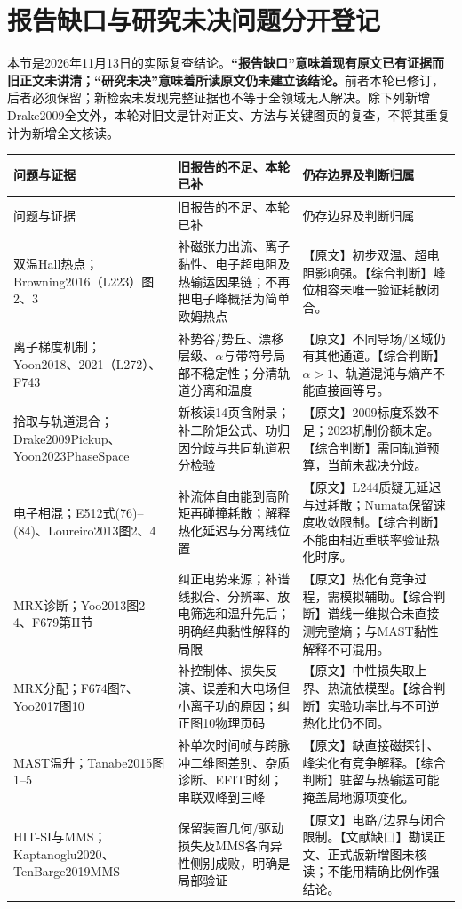 \section{报告缺口与研究未决问题分开登记}
\label{sec:gap_map}
本节是2026年11月13日的实际复查结论。\textbf{“报告缺口”意味着现有原文已有证据而旧正文未讲清；“研究未决”意味着所读原文仍未建立该结论。}前者本轮已修订，后者必须保留；新检索未发现完整证据也不等于全领域无人解决。除下列新增Drake2009全文外，本轮对旧文是针对正文、方法与关键图页的复查，不将其重复计为新增全文核读。
\begingroup\small
\begin{longtable}{P{30mm}P{59mm}P{59mm}}
\toprule 问题与证据 & 旧报告的不足、本轮已补 & 仍存边界及判断归属\\\midrule\endfirsthead
\toprule 问题与证据 & 旧报告的不足、本轮已补 & 仍存边界及判断归属\\\midrule\endhead
双温Hall热点；Browning2016（L223）图2、3 & 补磁张力出流、离子黏性、电子超电阻及热输运因果链；不再把电子峰概括为简单欧姆热点 & 【原文】初步双温、超电阻影响强。【综合判断】峰位相容未唯一验证耗散闭合。\\
离子梯度机制；Yoon2018、2021（L272）、F743 & 补势谷/势丘、漂移层级、$\alpha$与带符号局部不稳定性；分清轨道分离和温度 & 【原文】不同导场/区域仍有其他通道。【综合判断】$\alpha>1$、轨道混沌与熵产不能直接画等号。\\
拾取与轨道混合；Drake2009Pickup、Yoon2023\allowbreak PhaseSpace & 新核读14页含附录；补二阶矩公式、功归因分歧与共同轨道积分检验 & 【原文】2009标度系数不足；2023机制份额未定。【综合判断】需同轨道预算，当前未裁决分歧。\\
电子相混；E512式(76)--(84)、Loureiro2013图2、4 & 补流体自由能到高阶矩再碰撞耗散；解释热化延迟与分离线位置 & 【原文】L244质疑无延迟与过耗散；Numata保留速度收敛限制。【综合判断】不能由相近重联率验证热化时序。\\
MRX诊断；Yoo2013图2--4、F679第II节 & 纠正电势来源；补谱线拟合、分辨率、放电筛选和温升先后；明确经典黏性解释的局限 & 【原文】热化有竞争过程，需模拟辅助。【综合判断】谱线一维拟合未直接测完整熵；与MAST黏性解释不可混用。\\
MRX分配；F674图7、Yoo2017图10 & 补控制体、损失反演、误差和大电场但小离子功的原因；纠正图10物理页码 & 【原文】中性损失取上界、热流依模型。【综合判断】实验功率比与不可逆热化比仍不同。\\
MAST温升；Tanabe2015图1--5 & 补单次时间帧与跨脉冲二维图差别、杂质诊断、EFIT时刻；串联双峰到三峰 & 【原文】缺直接磁探针、峰尖化有竞争解释。【综合判断】驻留与热输运可能掩盖局地源项变化。\\
HIT-SI与MMS；Kaptanoglu2020、TenBarge2019MMS & 保留装置几何/驱动损失及MMS各向异性侧别成败，明确是局部验证 & 【原文】电路/边界与闭合限制。【文献缺口】勘误正文、正式版新增图未核读；不能用精确比例作强结论。\\
\bottomrule\end{longtable}\endgroup

